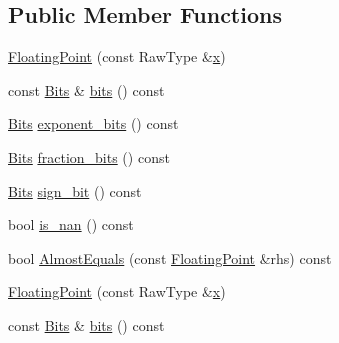 \subsection*{Public Member Functions}
\begin{DoxyCompactItemize}
\item 
\mbox{\hyperlink{classtesting_1_1internal_1_1_floating_point_a0dabf840863e0df84046f171c891fe71}{Floating\+Point}} (const Raw\+Type \&\mbox{\hyperlink{_obj__test_2lib_2googletest-master_2googlemock_2test_2gmock-matchers__test_8cc_a6150e0515f7202e2fb518f7206ed97dc}{x}})
\item 
const \mbox{\hyperlink{classtesting_1_1internal_1_1_floating_point_abf228bf6cd48f12c8b44c85b4971a731}{Bits}} \& \mbox{\hyperlink{classtesting_1_1internal_1_1_floating_point_aab053be914bdc9e507c0db89740c318c}{bits}} () const
\item 
\mbox{\hyperlink{classtesting_1_1internal_1_1_floating_point_abf228bf6cd48f12c8b44c85b4971a731}{Bits}} \mbox{\hyperlink{classtesting_1_1internal_1_1_floating_point_af6bf8fab8df572ecb137a3516ff390ae}{exponent\+\_\+bits}} () const
\item 
\mbox{\hyperlink{classtesting_1_1internal_1_1_floating_point_abf228bf6cd48f12c8b44c85b4971a731}{Bits}} \mbox{\hyperlink{classtesting_1_1internal_1_1_floating_point_aa17337e50a2ac855719bc0676529558f}{fraction\+\_\+bits}} () const
\item 
\mbox{\hyperlink{classtesting_1_1internal_1_1_floating_point_abf228bf6cd48f12c8b44c85b4971a731}{Bits}} \mbox{\hyperlink{classtesting_1_1internal_1_1_floating_point_afb8a816bb598225d775caaf43a893ef0}{sign\+\_\+bit}} () const
\item 
bool \mbox{\hyperlink{classtesting_1_1internal_1_1_floating_point_a1fc654fd206efa98e480aa1e034f30d5}{is\+\_\+nan}} () const
\item 
bool \mbox{\hyperlink{classtesting_1_1internal_1_1_floating_point_a965214c1af2f9ac5adb1393794aa81e5}{Almost\+Equals}} (const \mbox{\hyperlink{classtesting_1_1internal_1_1_floating_point}{Floating\+Point}} \&rhs) const
\item 
\mbox{\hyperlink{classtesting_1_1internal_1_1_floating_point_a0dabf840863e0df84046f171c891fe71}{Floating\+Point}} (const Raw\+Type \&\mbox{\hyperlink{_obj__test_2lib_2googletest-master_2googlemock_2test_2gmock-matchers__test_8cc_a6150e0515f7202e2fb518f7206ed97dc}{x}})
\item 
const \mbox{\hyperlink{classtesting_1_1internal_1_1_floating_point_abf228bf6cd48f12c8b44c85b4971a731}{Bits}} \& \mbox{\hyperlink{classtesting_1_1internal_1_1_floating_point_aab053be914bdc9e507c0db89740c318c}{bits}} () const

\end{DoxyCompactItemize}
